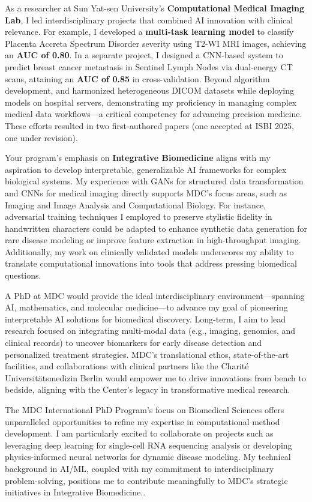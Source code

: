 \documentclass[11pt,a4paper, final]{moderncv}
\begin{document}
As a researcher at Sun Yat-sen University's \textbf{Computational Medical Imaging Lab}, 
I led interdisciplinary projects that combined AI innovation with clinical relevance. 
For example, I developed a \textbf{multi-task learning model} to 
classify Placenta Accreta Spectrum Disorder severity using T2-WI MRI images, achieving an \textbf{AUC of 0.80}. 
In a separate project, 
I designed a CNN-based system to predict breast cancer metastasis in Sentinel Lymph Nodes via dual-energy CT scans, 
attaining an \textbf{AUC of 0.85} in cross-validation. 
Beyond algorithm development, and harmonized heterogeneous DICOM datasets while deploying models on hospital servers, 
demonstrating my proficiency in managing complex medical data workflows—a critical competency for advancing precision medicine. 
These efforts resulted in two first-authored papers (one accepted at ISBI 2025, one under revision).

Your program's emphasis on \textbf{Integrative Biomedicine} 
aligns with my aspiration to develop interpretable, 
generalizable AI frameworks for complex biological systems. 
My experience with GANs for structured data transformation and CNNs for medical imaging directly supports MDC's focus areas, such as Imaging and Image Analysis and Computational Biology. 
For instance, adversarial training techniques I employed to preserve stylistic fidelity in handwritten characters could be adapted to enhance synthetic data generation for rare disease modeling or improve feature extraction in high-throughput imaging. 
Additionally, my work on clinically validated models underscores my ability to translate computational innovations into tools that address pressing biomedical questions.

A PhD at MDC would provide the ideal interdisciplinary environment—spanning AI, mathematics, and molecular medicine—to advance my goal of pioneering interpretable AI solutions for biomedical discovery. 
Long-term, I aim to lead research focused on integrating multi-modal data (e.g., imaging, genomics, and clinical records) to uncover biomarkers for early disease detection and personalized treatment strategies. 
MDC's translational ethos, state-of-the-art facilities, and collaborations with clinical partners like the Charité Universitätsmedizin Berlin would empower me to drive innovations from bench to bedside, aligning with the Center's legacy in transformative medical research.

The MDC International PhD Program's focus on Biomedical Sciences offers unparalleled opportunities to refine my expertise in computational method development. 
I am particularly excited to collaborate on projects such as leveraging deep learning for single-cell RNA sequencing analysis or developing physics-informed neural networks for dynamic disease modeling. 
My technical background in AI/ML, coupled with my commitment to interdisciplinary problem-solving, positions me to contribute meaningfully to MDC's strategic initiatives in Integrative Biomedicine..
\end{document}

